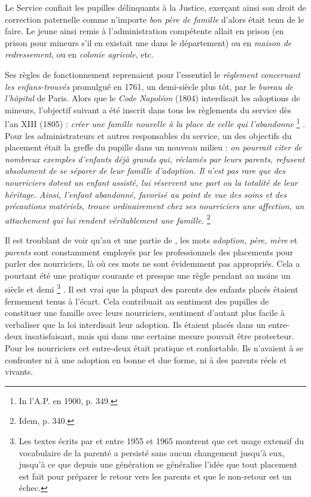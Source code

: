  Le Service confiait les pupilles délinquants à la Justice, exerçant ainsi son droit de correction paternelle comme n'importe \emph{bon père de famille} d'alors était tenu de le faire. Le jeune ainsi remis à l'administration compétente allait en prison (en prison pour mineurs s'il en existait une dans le département) ou en \emph{maison de redressement}, ou en \emph{colonie agricole}, etc. 

 Ses règles de fonctionnement reprenaient pour l'essentiel le \emph{règlement concernant les enfans-trouvés} promulgué en 1761, un demi-siècle plus tôt, par le \emph{bureau de l'hôpital} de Paris. Alors que le \emph{Code Napoléon} (1804) interdisait les adoptions de mineurs, l'objectif suivant a été inscrit dans tous les règlements du service dès l'an XIII (1805) : \emph{créer une famille nouvelle à la place de celle qui l'abandonne}%
\footnote{In l'A.P. en 1900, p. 349.}%
. Pour les administrateurs et autres responsables du service, un des objectifs du placement était la greffe du pupille dans un nouveau milieu : \emph{on pourrait citer de nombreux exemples d'enfants déjà grands qui, réclamés par leurs parents, refusent absolument de se séparer de leur famille d'adoption. Il n'est pas rare que des nourriciers dotent un enfant assisté, lui réservent une part ou la totalité de leur héritage. Ainsi, l'enfant abandonné, favorisé au point de vue des soins et des précautions matériels, trouve ordinairement chez ses nourriciers une affection, un attachement qui lui rendent véritablement une famille.}%
\footnote{Idem, p. 340.} 

 Il est troublant de voir qu'au  et une partie de , les mots \emph{adoption, père, mère} et \emph{parents} sont constamment employés par les professionnels des placements pour parler des nourriciers, là où ces mots ne sont évidemment pas appropriés. Cela a pourtant été une pratique courante et presque une règle pendant au moins un siècle et demi%
\footnote{Les textes écrits par  et  entre 1955 et 1965 montrent que cet usage extensif du vocabulaire de la parenté a persisté sans aucun changement jusqu'à eux, jusqu'à ce que depuis une génération se généralise l'idée que tout placement est fait pour préparer le retour vers les parents et que le non-retour est un échec.}%
. Il est vrai que la plupart des parents des enfants placés étaient fermement tenus à l'écart. Cela contribuait au sentiment des pupilles de constituer une famille avec leurs nourriciers, sentiment d'autant plus facile à verbaliser que la loi interdisait leur adoption. Ils étaient placés dans un entre-deux insatisfaisant, mais qui dans une certaine mesure pouvait être protecteur. Pour les nourriciers cet entre-deux était pratique et confortable. Ils n'avaient à se confronter ni à une adoption en bonne et due forme, ni à des parents réels et vivants. 

